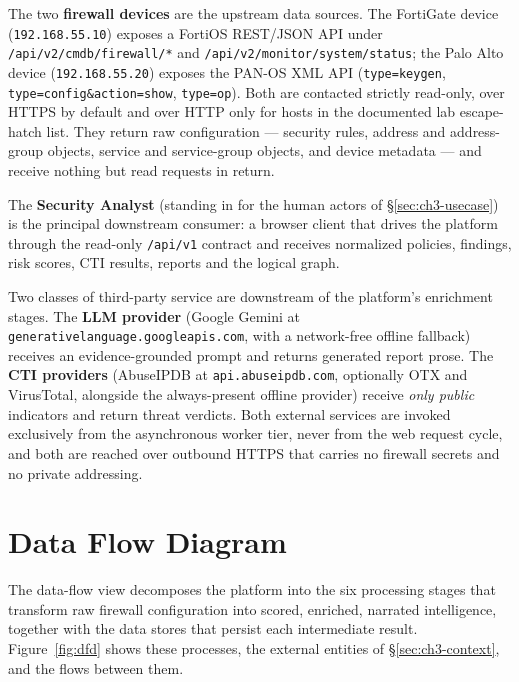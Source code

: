 \documentclass[12pt,a4paper]{report}
\renewcommand{\_}{\textunderscore\allowbreak}
\begin{document}
The two \textbf{firewall devices} are the upstream data sources. The FortiGate device (\texttt{192.168.55.10}) exposes a FortiOS REST/JSON API under \texttt{/api/v2/cmdb/firewall/*} and \texttt{/api/v2/monitor/system/status}; the Palo Alto device (\texttt{192.168.55.20}) exposes the PAN-OS XML API (\texttt{type=keygen}, \texttt{type=config\&action=show}, \texttt{type=op}). Both are contacted strictly read-only, over HTTPS by default and over HTTP only for hosts in the documented lab escape-hatch list. They return raw configuration --- security rules, address and address-group objects, service and service-group objects, and device metadata --- and receive nothing but read requests in return.

The \textbf{Security Analyst} (standing in for the human actors of \S\ref{sec:ch3-usecase}) is the principal downstream consumer: a browser client that drives the platform through the read-only \texttt{/api/v1} contract and receives normalized policies, findings, risk scores, CTI results, reports and the logical graph.

Two classes of third-party service are downstream of the platform's enrichment stages. The \textbf{LLM provider} (Google Gemini at \texttt{generativelanguage.googleapis.com}, with a network-free offline fallback) receives an evidence-grounded prompt and returns generated report prose. The \textbf{CTI providers} (AbuseIPDB at \texttt{api.abuseipdb.com}, optionally OTX and VirusTotal, alongside the always-present offline provider) receive \textit{only public} indicators and return threat verdicts. Both external services are invoked exclusively from the asynchronous worker tier, never from the web request cycle, and both are reached over outbound HTTPS that carries no firewall secrets and no private addressing.

\section{Data Flow Diagram}
\label{sec:ch3-dfd}

The data-flow view decomposes the platform into the six processing stages that transform raw firewall configuration into scored, enriched, narrated intelligence, together with the data stores that persist each intermediate result. Figure~\ref{fig:dfd} shows these processes, the external entities of \S\ref{sec:ch3-context}, and the flows between them.
\end{document}
